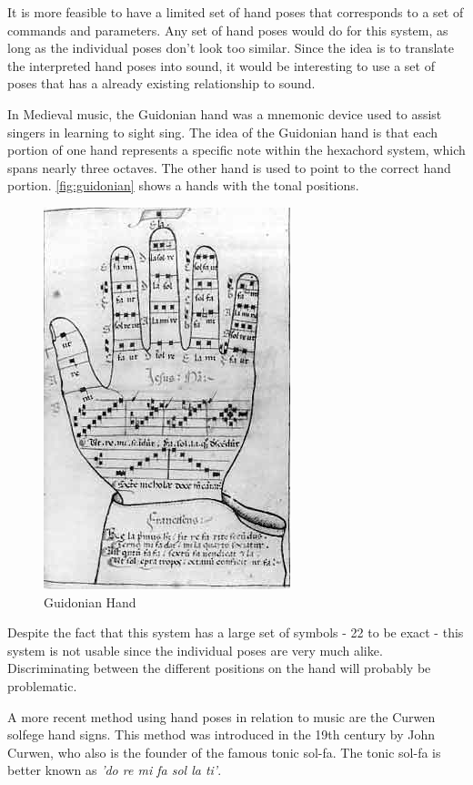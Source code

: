 It is more feasible to have a limited set of hand poses that corresponds to a set of commands and parameters.  Any set of hand poses would do for this system, as long as the individual poses don't look too similar. Since the idea is to translate the interpreted hand poses into sound, it would be interesting to use a set of poses that has a already existing relationship to sound.

In Medieval music, the Guidonian hand was a mnemonic device used to assist singers in learning to sight sing. The idea of the Guidonian hand is that each portion of one hand represents a specific note within the hexachord system, which spans nearly three octaves. The other hand is used to point to the correct hand portion. \autoref{fig:guidonian} shows a hands with the tonal positions.

\begin{figure}[htbp]
	\centering{}
	\includegraphics[width=0.3\linewidth]{figures/guidonian_hand.jpg}
	\caption{Guidonian Hand}
	\label{fig:guidonian}
\end{figure}

Despite the fact that this system has a large set of symbols - 22 to be exact - this system is not usable since the individual poses are very much alike. Discriminating between the different positions on the hand will probably be problematic.

A more recent method using hand poses in relation to music are the Curwen solfege hand signs\cite{choksy1999}. This method was introduced in the 19th century by John Curwen, who also is the founder of the famous tonic sol-fa. The tonic sol-fa is better known as \emph{'do re mi fa sol la ti'}.

